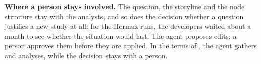 \textbf{Where a person stays involved.} The question, the storyline and the node structure stay with the analysts, and so does the decision whether a question justifies a new study at all: for the Hormuz runs, the developers waited about a month to see whether the situation would last.
The agent proposes edits; a person approves them before they are applied.
In the terms of \citet{parasuraman2000model}, the agent gathers and analyses, while the decision stays with a person.
